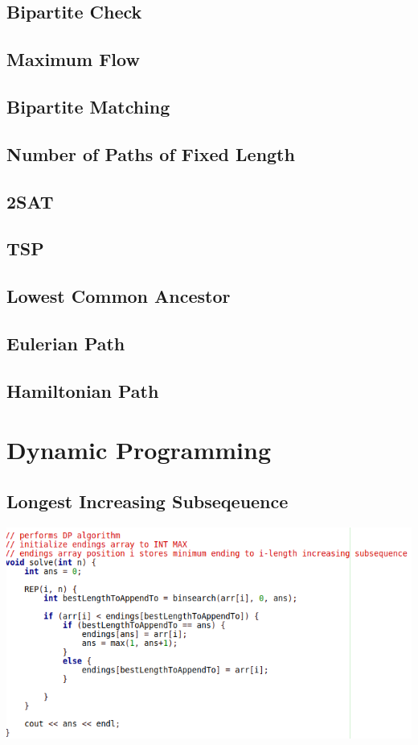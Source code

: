 \documentclass[11pt,twocolumn]{article}
\begin{document}
\subsection{Bipartite Check}

\subsection{Maximum Flow}

\subsection{Bipartite Matching}

\subsection{Number of Paths of Fixed Length}

\subsection{2SAT}

\subsection{TSP}

\subsection{Lowest Common Ancestor}

\subsection{Eulerian Path}

\subsection{Hamiltonian Path}

\section{Dynamic Programming}
\subsection{Longest Increasing Subseqeuence}

\includegraphics[scale=0.5]{lis}
\end{document}

